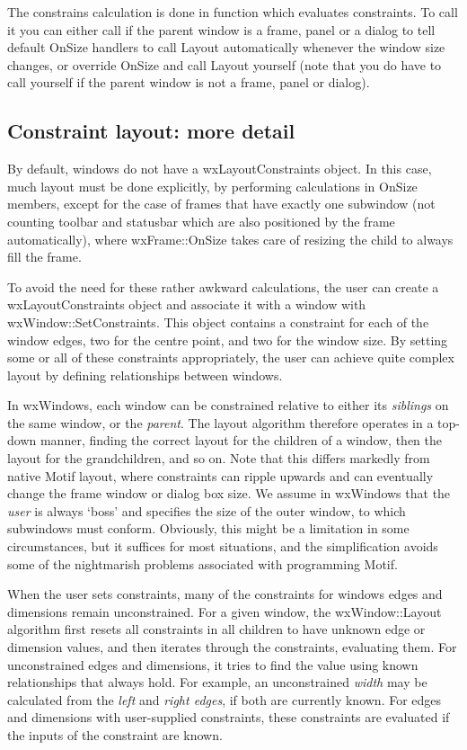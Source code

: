 The constrains calculation is done in  
function which evaluates constraints. To call it you can either call
 if the parent window
is a frame, panel or a dialog to tell default OnSize handlers to call Layout
automatically whenever the window size changes, or override OnSize and call
Layout yourself (note that you do have to call 
 yourself if the parent window is not a
frame, panel or dialog).

\subsection{Constraint layout: more detail}

By default, windows do not have a wxLayoutConstraints object. In this case, much layout
must be done explicitly, by performing calculations in OnSize members, except
for the case of frames that have exactly one subwindow (not counting toolbar and
statusbar which are also positioned by the frame automatically), where wxFrame::OnSize
takes care of resizing the child to always fill the frame.

To avoid the need for these rather awkward calculations, the user can create
a wxLayoutConstraints object and associate it with a window with wxWindow::SetConstraints.
This object contains a constraint for each of the window edges, two for the centre point,
and two for the window size. By setting some or all of these constraints appropriately,
the user can achieve quite complex layout by defining relationships between windows.

In wxWindows, each window can be constrained relative to either its {\it
siblings} on the same window, or the {\it parent}. The layout algorithm
therefore operates in a top-down manner, finding the correct layout for
the children of a window, then the layout for the grandchildren, and so
on. Note that this differs markedly from native Motif layout, where
constraints can ripple upwards and can eventually change the frame
window or dialog box size. We assume in wxWindows that the {\it user} is
always `boss' and specifies the size of the outer window, to which
subwindows must conform. Obviously, this might be a limitation in some
circumstances, but it suffices for most situations, and the
simplification avoids some of the nightmarish problems associated with
programming Motif.

When the user sets constraints, many of the constraints for windows
edges and dimensions remain unconstrained. For a given window,
the wxWindow::Layout algorithm first resets all constraints
in all children to have unknown edge or dimension values, and then iterates through the constraints,
evaluating them. For unconstrained edges and dimensions, it
tries to find the value using known relationships that always hold. For example,
an unconstrained {\it width} may be calculated from the {\it left} and {\it right edges}, if
both are currently known. For edges and dimensions with user-supplied constraints, these
constraints are evaluated if the inputs of the constraint are known.

